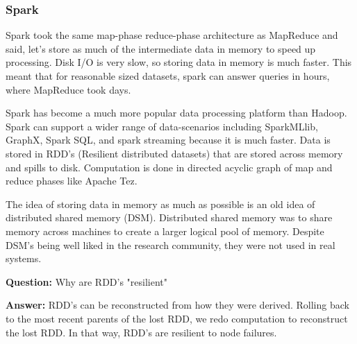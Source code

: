 \documentclass[a4paper]{article}
\begin{document}
\subsubsection{Spark}

Spark took the same map-phase reduce-phase architecture as MapReduce and said, let's store as much of the intermediate data in memory to speed up processing. Disk I/O is very slow, so storing data in memory is much faster. This meant that for reasonable sized datasets, spark can answer queries in hours, where MapReduce took days.


Spark has become a much more popular data processing platform than Hadoop. Spark can support a wider range of data-scenarios including SparkMLlib, GraphX, Spark SQL, and spark streaming because it is much faster. Data is stored in RDD's (Resilient distributed datasets) that are stored across memory and spills to disk. Computation is done in directed acyclic graph of map and reduce phases like Apache Tez.

The idea of storing data in memory as much as possible is an old idea of distributed shared memory (DSM). Distributed shared memory was to share memory across machines to create a larger logical pool of memory. Despite DSM's being well liked in the research community, they were not used in real systems. 

\textbf{Question:} Why are RDD's "resilient"

\textbf{Answer:} RDD's can be reconstructed from how they were derived. Rolling back to the most recent parents of the lost RDD, we redo computation to reconstruct the lost RDD. In that way, RDD's are resilient to node failures.
\end{document}
